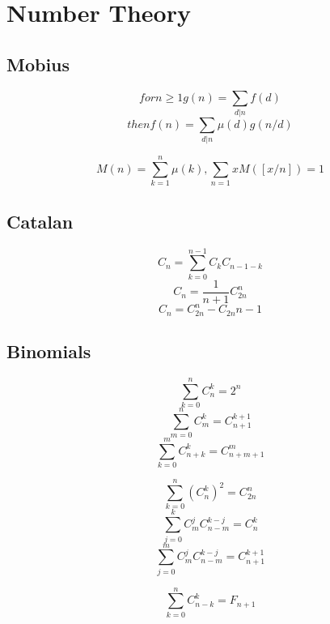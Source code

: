 \section{Number Theory}


\subsection{Mobius}
$$for n \ge 1 g(n) = \sum_{d|n}f(d)$$ 
$$then f(n) = \sum_{d|n}\mu(d)g(n/d)$$

$$M(n) = \sum_{k=1}^{n}\mu(k), \sum_{n = 1}{x} M([x/n]) = 1$$

\subsection{Catalan}
$$C_n = \sum_{k = 0}^{n - 1} C_kC_{n - 1 - k}$$ 
$$C_n = \frac{1}{n + 1} C_{2n}^{n}$$
$$C_n = C_{2n}^{n} - C_{2n}{n - 1}$$

\subsection{Binomials}
$$\sum_{k = 0}^{n} C_n^k = 2^n$$ 
$$\sum_{m = 0}^{n} C_m^k = C_{n + 1}^{k + 1}$$
$$\sum_{k = 0}^{m} C_{n + k}^k = C_{n + m + 1}^m$$

$$\sum_{k = 0}^{n} (C_n^k)^2 = C_{2n}^n$$
$$\sum_{j = 0}^{k} C_m^j C_{n-m}^{k - j} = C_n^k$$
$$\sum_{j = 0}^{m} C_m^j C_{n-m}^{k - j} = C_{n + 1}^{k + 1}$$

$$\sum_{k = 0}^{n} C_{n - k}^k = F_{n + 1}$$



